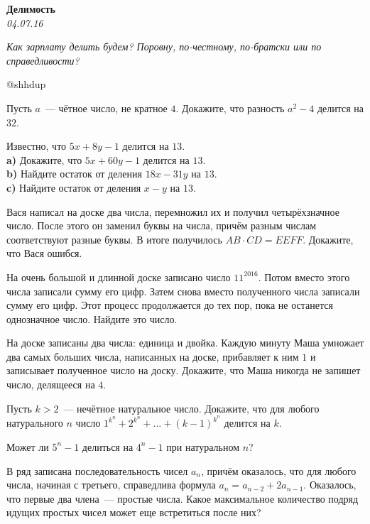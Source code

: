 \begin{center}
\textbf{\Large Делимость}\\
\textit{04.07.16}
\end{center}

\epigraph{\it Как зарплату делить будем? Поровну, по-честному, по-братски или по справедливости?}{@shhdup}

\begin{problems}
\item Пусть $a$~--- чётное число, не кратное $4$. Докажите, что разность $a^2 - 4$ делится на $32$.
\item Известно, что $5x+8y-1$ делится на $13$.\\ \textbf{a)} Докажите, что $5x+60y-1$ делится на $13$.\\ \textbf{b)} Найдите остаток от деления $18x-31y$ на $13$. \\ \textbf{c)} Найдите остаток от деления $x-y$ на $13$.
\item Вася написал на доске два числа, перемножил их и получил четырёхзначное число. После этого он заменил буквы на числа, причём разным числам соответствуют разные буквы. В итоге получилось $AB \cdot CD = EEFF$. Докажите, что Вася ошибся.
\item На очень большой и длинной доске записано число $11^{2016}$. Потом вместо этого числа записали сумму его цифр. Затем снова вместо полученного числа записали сумму его цифр. Этот процесс продолжается до тех пор, пока не останется однозначное число. Найдите это число. 
\item На доске записаны два числа: единица и двойка. Каждую минуту Маша умножает два самых больших числа, написанных на доске, прибавляет к ним $1$ и записывает полученное число на доску. Докажите, что Маша никогда не запишет число, делящееся на $4$.
\item Пусть $k>2$~--- нечётное натуральное число. Докажите, что для любого натурального $n$ число $1^{k^n}+2^{k^n}+...+(k-1)^{k^n}$ делится на $k$.
\item Может ли $5^n-1$ делиться на $4^n-1$ при натуральном $n$? 
\item В ряд записана последовательность чисел $a_n$, причём оказалось, что для любого числа, начиная с третьего, справедлива формула $a_n=a_{n-2}+2a_{n-1}$. Оказалось, что первые два члена~--- простые числа. Какое максимальное количество подряд идущих простых чисел может еще встретиться после них?

\end{problems}
